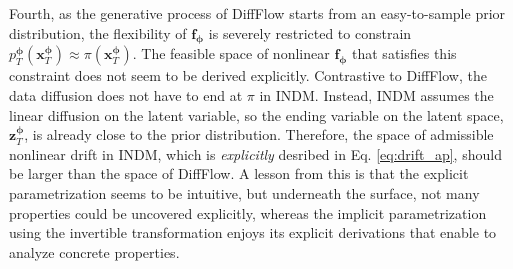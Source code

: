 \documentclass{article}
\theoremstyle{definition}
\theoremstyle{remark}
\begin{document}
	Fourth, as the generative process of DiffFlow starts from an easy-to-sample prior distribution, the flexibility of $\mathbf{f}_{\bm{\phi}}$ is severely restricted to constrain $p_{T}^{\bm{\phi}}(\mathbf{x}_{T}^{\bm{\phi}})\approx \pi(\mathbf{x}_{T}^{\bm{\phi}})$. The feasible space of nonlinear $\mathbf{f}_{\bm{\phi}}$ that satisfies this constraint does not seem to be derived explicitly. Contrastive to DiffFlow, the data diffusion does not have to end at $\pi$ in INDM. Instead, INDM assumes the linear diffusion on the latent variable, so the ending variable on the latent space, $\mathbf{z}_{T}^{\bm{\phi}}$, is already close to the prior distribution. Therefore, the space of admissible nonlinear drift in INDM, which is \textit{explicitly} desribed in Eq. \eqref{eq:drift_ap}, should be larger than the space of DiffFlow. A lesson from this is that the explicit parametrization seems to be intuitive, but underneath the surface, not many properties could be uncovered explicitly, whereas the implicit parametrization using the invertible transformation enjoys its explicit derivations that enable to analyze concrete properties.
	
\end{document}
